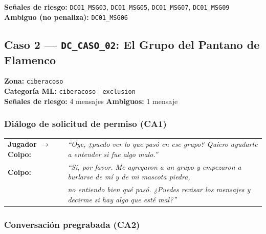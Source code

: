 \documentclass[12pt,a4paper]{article}
\begin{document}
\medskip
\noindent\textbf{Señales de riesgo:} \texttt{DC01\_MSG03}, \texttt{DC01\_MSG05}, \texttt{DC01\_MSG07}, \texttt{DC01\_MSG09}\\
\textbf{Ambiguo (no penaliza):} \texttt{DC01\_MSG06}

\subsection{Caso 2 --- \texttt{DC\_CASO\_02}: El Grupo del Pantano de Flamenco}

\textbf{Zona:} \texttt{ciberacoso}\\
\textbf{Categoría ML:} \texttt{ciberacoso} | \texttt{exclusion}\\
\textbf{Señales de riesgo:} 4 mensajes \quad \textbf{Ambiguos:} 1 mensaje

\subsubsection*{Diálogo de solicitud de permiso \hfill \small(CA1)}

\begin{tabular}{@{}ll@{}}
\textbf{Jugador $\rightarrow$ Coipo:} & \textit{``Oye, ¿puedo ver lo que pasó en ese grupo? Quiero ayudarte a entender si fue algo malo.''} \\[4pt]
\textbf{Coipo:}                        & \textit{``Sí, por favor. Me agregaron a un grupo y empezaron a burlarse de mí y de mi mascota piedra,}\\
                                           & \textit{no entiendo bien qué pasó. ¿Puedes revisar los mensajes y decirme si hay algo que esté mal?''}
\end{tabular}

\subsubsection*{Conversación pregrabada \hfill \small(CA2)}
\end{document}
